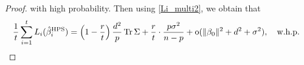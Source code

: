\begin{example}
\begin{proof}
    with high probability.
    Then using \eqref{Li_multi2}, we obtain that
    \[ \frac{1}{t}\sum_{i=1}^t L_i(\hat{\beta}_i^{\textup{HPS}}) = \left({1 - \frac{r}{t}}\right) \frac{d^2}{p}\operatorname{Tr} \Sigma + \frac{r}{t} \cdot \frac{p\sigma^2 }{n - p} +\operatorname{o}(\|\beta_0\|^2+d^2 + \sigma^2) ,\quad \text{w.h.p. }\]
\end{proof}
\end{example}






